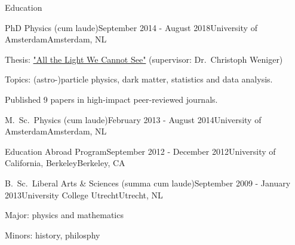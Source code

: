 \documentclass{resume} %
\begin{document}

\begin{rSection}{Education}

\begin{rSubsection}{PhD Physics (cum laude)}{September 2014 - August 2018}{University of Amsterdam}{Amsterdam, NL}
\vspace{-1.5em}
\item Thesis: \href{https://pure.uva.nl/ws/files/28193639/Thesis.pdf}{"All the Light We Cannot See"} (supervisor: Dr.~Christoph Weniger)
\item Topics: (astro-)particle physics, dark matter, statistics and data analysis.
\item Published 9 papers in high-impact peer-reviewed journals.
\end{rSubsection}

\begin{rSubsection}{M.~Sc.~Physics (cum laude)}{February 2013 - August 2014}{University of Amsterdam}{Amsterdam, NL}
\vspace{-1.5em}
\end{rSubsection}

\begin{rSubsection}{Education Abroad Program}{September 2012 - December 2012}{University of California, Berkeley}{Berkeley, CA}
\vspace{-1.5em}
\end{rSubsection}

\begin{rSubsection}{B.~Sc.~Liberal Arts \& Sciences (summa cum laude)}{September 2009 - January 2013}{University College Utrecht}{Utrecht, NL}
\vspace{-1.5em}
 \item Major: physics and mathematics
 \item Minors: history, philosphy
\end{rSubsection}
\end{rSection}

\end{document}
